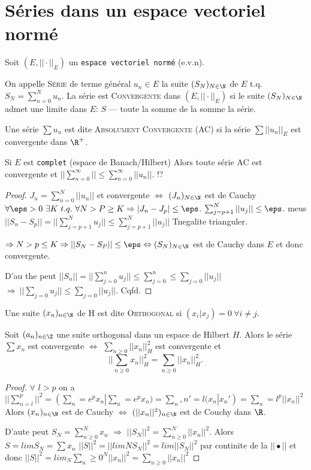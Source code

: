 \section{Séries dans un espace vectoriel normé} %

Soit $(E, ||\cdot||_E)$ un \texttt{espace vectoriel normé} (e.v.n).
\begin{definition}
	On appelle \textsc{Série} de terme général $u_n\in E$ la suite $(S_N)_{N\in \N}$ de $E$ t.q.  $S_N=\sum\limits_{n=0}^Nu_n$.
	La série est \textsc{Convergente} dans $(E, ||\cdot||_E)$ si le suite $(S_N)_{N\in\N}$ admet une limite dans $E$: $S$ --- toute la somme de la somme la série.
\end{definition}



\begin{definition}
	Une série $\sum u_n$ est dite \textsc{Absolument Convergente} (AC) si la série $\sum ||u_n||_E$ est convergente dans $\R^+$.
\end{definition}

\begin{theorem}
	Si $E$ est \texttt{complet} (espace de Banach/Hilbert) Alors toute série AC est convergente et $||\sum\limits_{n=0}^\infty||\leq \sum\limits_{n=0}^\infty||u_n||$. !?
\end{theorem}
\begin{proof}
	$J_n=\sum\limits_{n=0}^N||u_n||$ et convergente $\Leftrightarrow$ $(J_n)_{N\in\N}$ est de Cauchy $\forall \eps >0\ \exists K\ t.q.\ \forall N>P\geq K\Rightarrow |J_n-J_p|\leq \eps$. $\sum_{j=p+1}^N||u_j||\leq \eps$. meus $||S_n-S_p||=||\sum_{j=p+1}^Nu_j||\leq\sum_{j=p+1}^N ||u_j||$ Tnegalite trianguler.
	
	$\Rightarrow N>p\leq K\Rightarrow ||S_N-S_P||\leq \eps \Leftrightarrow (S_N)_{N\in \N}$ est de Cauchy dans $E$ et donc convergente.
	
	D'au the peut $||S_n||=||\sum_{j=0}^n u_j||\leq\sum_{j=0}^n\leq \sum_{j=0}||u_j||$ $\Rightarrow\ ||\sum_{j=0}u_j||\leq \sum_{j=0}||u_j||$. Cqfd.
\end{proof}

\begin{definition}
	Une suite $(x_n)_{n\in \N}$ de H est dite \textsc{Orthogonal} si $(x_i|x_j)=0\ \forall i≠j$.
\end{definition}

\begin{theorem}
	Soit $(a_n)_{n\in \Z}$ une suite orthogonal dans un espace de Hilbert $H$. Alors le série $∑x_n$ est convergente $\Longleftrightarrow$ $∑_{n≥0}||x_n||_H^2$ est convergente et \[ ||∑_{n≥0}x_n||^2_H=∑_{n≥0}||x_n||_H^2.\]
\end{theorem}
\begin{proof}
	$\forall$ $l>p$ on a $||∑_{n=l}^p||^2=(∑_n=e^p x_n | ∑_n=e^p x_n)=∑_n,n'=l(x_n|x_n')=∑_n=l^p||x_n||^2$ Alors $(x_n)_{n\in \N}$ est de Cauchy $\Leftrightarrow$ $(||x_n||^2)_{n\in \N}$ est de Couchy dans $\R$.

D'aute peut $S_N=∑_{n≥0}^N x_n$ $\Rightarrow$  $||S_N||^2=∑_{n≥0}^N||x_n||^2$.
Alors $S=lim S_N=∑x_n$ $||S||^2=||lim N S_N||^2=lim ||S_N||^2$ par continite de la $||•||$ et donc $||S||^2=lim_N∑_n≥0^N||x_n||^2=∑_{n≥0}||x_n||^2$
\end{proof}

